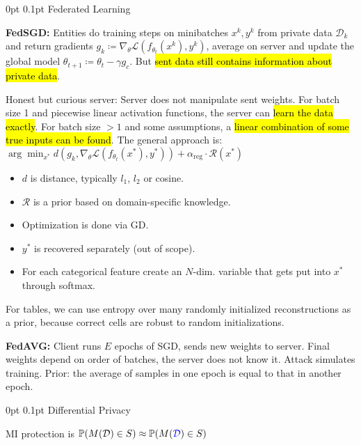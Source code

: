 \documentclass[11pt,landscape,a4paper,fleqn]{article}
\makeatletter
\renewcommand{\subsection}{\@startsection{subsection}{1}{0mm}%
                                {0pt}%
                                {0.1pt}%
                            	{\color{myorange2}\sffamily\small}}
\newcommand{\mhl}[1]{#1}
\makeatother
\begin{document}
\begin{multicols*}{4}
\subsection{Federated Learning}

\textbf{FedSGD:}
Entities do training steps on minibatches \({x^k, y^k}\) from private data \(\mathcal{D}_k\)
and return gradients \(g_k \coloneqq \nabla_\theta \mathcal{L}(f_{\theta_t}(x^k), y^k)\),
average on server
and update the global model \(\theta_{t+1} \coloneqq \theta_t - \gamma g_c\).
But \hl{sent data still contains information about private data}.

Honest but curious server: Server does not manipulate sent weights.
For batch size 1 and piecewise linear activation functions, the server can \hl{learn the data exactly}.
For batch size \(> 1\) and some assumptions, a \hl{linear combination of some true inputs can be found}.
The general approach is:
\mhl{\(\arg\min_{x^*} d(g_k, \nabla_\theta \mathcal{L}(f_{\theta_t}(x^*), y^*)) + \alpha_{\mathrm{reg}} \cdot \mathcal{R}(x^*)\)}
\begin{itemize}
    \item \(d\) is distance, typically \(l_1\), \(l_2\) or cosine.
    \item \(\mathcal{R}\) is a prior based on domain-specific knowledge.
    \item Optimization is done via GD.
    \item \(y^*\) is recovered separately (out of scope).
    \item For each categorical feature create an \(N\)-dim. variable that gets put into \(x^*\)
    through softmax.
\end{itemize}

For tables, we can use entropy over many randomly initialized reconstructions as a prior,
because correct cells are robust to random initializations.

\textbf{FedAVG:}
Client runs \(E\) epochs of SGD, sends new weights to server.
Final weights depend on order of batches, the server does not know it.
Attack simulates training.
Prior: the average of samples in one epoch is equal to that in another epoch.

\subsection{Differential Privacy}

MI protection is \mhl{\(\mathbb{P}({M}(\mathcal{D}) \in S) \approx \mathbb{P}({M}(\textcolor{blue}{\mathcal{D}}) \in S)\)}


\end{multicols*}
\end{document}
